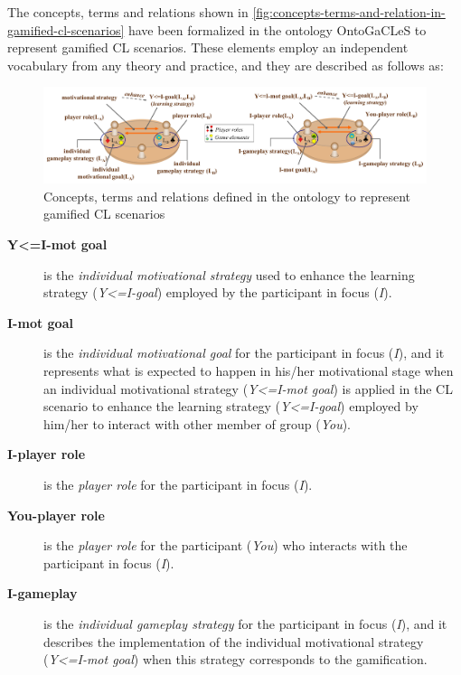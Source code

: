 The concepts, terms and relations shown in \autoref{fig:concepts-terms-and-relation-in-gamified-cl-scenarios} have been formalized in the ontology OntoGaCLeS to represent gamified CL scenarios. These elements employ an independent vocabulary from any theory and practice, and they are described as follows as:

\begin{figure}[!htbp]
 \caption{Concepts, terms and relations defined in the ontology to represent gamified CL scenarios}
 \label{fig:concepts-terms-and-relation-in-gamified-cl-scenarios}
 \centering
 \includegraphics[width=1\textwidth]{images/chap-ontogacles1/concepts-terms-and-relation-in-gamified-cl-scenarios.png}
 \fautor
\end{figure}

\begin{description}
\item[\textbf{Y<=I-mot goal}]
is the \emph{individual motivational strategy} used to enhance the learning strategy (\emph{Y<=I-goal}) employed by the participant in focus (\emph{I}).

\item[\textbf{I-mot goal}]
is the \emph{individual motivational goal} for the participant in focus (\emph{I}), and it represents what is expected to happen in his/her motivational stage when an individual motivational strategy (\emph{Y<=I-mot goal}) is applied in the CL scenario to enhance the learning strategy (\emph{Y<=I-goal}) employed by him/her to interact with other member of group (\emph{You}).

\item[\textbf{I-player role}]
is the \emph{player role} for the participant in focus (\emph{I}).

\item[\textbf{You-player role}]
is the \emph{player role} for the participant (\emph{You}) who interacts with the participant in focus (\emph{I}).

\item[\textbf{I-gameplay}]
is the \emph{individual gameplay strategy} for the participant in focus (\emph{I}), and it describes the implementation of the individual motivational strategy (\emph{Y<=I-mot goal}) when this strategy corresponds to the gamification.
\end{description}

